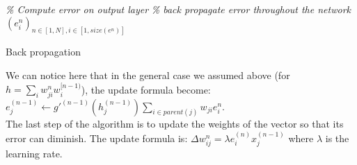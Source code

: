 	\begin{algorithm}[H]
		\BlankLine
		\emph{\% Compute error on output layer}\;
		\emph{\% back propagate error throughout the network}\;
		\Return $(e_i^n)_{n\in[1,N], i\in[1,size(e^n)]}$
	\caption{Back propagation}
	\label{alg:back_propagation}
	\end{algorithm}
	
	We can notice here that in the general case we assumed above (for $h = \sum_i w_{ji}^n w_i^{[n-1)}$), the update formula become: $e_j^{(n-1)} \leftarrow g'^{(n-1)}(h_j^{(n-1)}) \sum_{i\in parent(j)} w_{ji} e_i^{n}$. \\
	The last step of the algorithm is to update the weights of the vector so that its error can diminish. The update formula is: $\Delta w_{ij}^n = \lambda e_i^{(n)} x_j^{(n-1)}$ where $\lambda$ is the learning rate.


